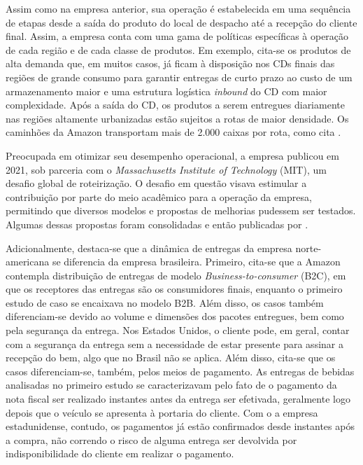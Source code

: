 Assim como na empresa anterior, sua operação é estabelecida em uma sequência de etapas desde a saída do produto do local de despacho até a recepção do cliente final.
Assim, a empresa conta com uma gama de políticas específicas à operação de cada região e de cada classe de produtos.
Em exemplo, cita-se os produtos de alta demanda que, em muitos casos, já ficam à disposição nos CDs finais das regiões de grande consumo para garantir entregas de curto prazo ao custo de um armazenamento maior e uma estrutura logística \textit{inbound} do CD com maior complexidade.
Após a saída do CD, os produtos a serem entregues diariamente nas regiões altamente urbanizadas estão sujeitos a rotas de maior densidade.
Os caminhões da Amazon transportam mais de 2.000 caixas por rota, como cita .

Preocupada em otimizar seu desempenho operacional, a empresa publicou em 2021, sob parceria com o \textit{Massachusetts Institute of Technology} (MIT), um desafio global de roteirização.
O desafio em questão visava estimular a contribuição por parte do meio acadêmico para a operação da empresa, permitindo que diversos modelos e propostas de melhorias pudessem ser testados.
Algumas dessas propostas foram consolidadas e então publicadas por . 

Adicionalmente, destaca-se que a dinâmica de entregas da empresa norte-americana se diferencia da empresa brasileira. 
Primeiro, cita-se que a Amazon contempla distribuição de entregas de modelo \textit{Business-to-consumer} (B2C), em que os receptores das entregas são os consumidores finais, enquanto o primeiro estudo de caso se encaixava no modelo B2B.
Além disso, os casos também diferenciam-se devido ao volume e dimensões dos pacotes entregues, bem como pela segurança da entrega.
Nos Estados Unidos, o cliente pode, em geral, contar com a segurança da entrega sem a necessidade de estar presente para assinar a recepção do bem, algo que no Brasil não se aplica.
Além disso, cita-se que os casos diferenciam-se, também, pelos meios de pagamento.
As entregas de bebidas analisadas no primeiro estudo se caracterizavam pelo fato de o pagamento da nota fiscal ser realizado instantes antes da entrega ser efetivada, geralmente logo depois que o veículo se apresenta à portaria do cliente.
Com o a empresa estadunidense, contudo, os pagamentos já estão confirmados desde instantes após a compra, não correndo o risco de alguma entrega ser devolvida por indisponibilidade do cliente em realizar o pagamento.

